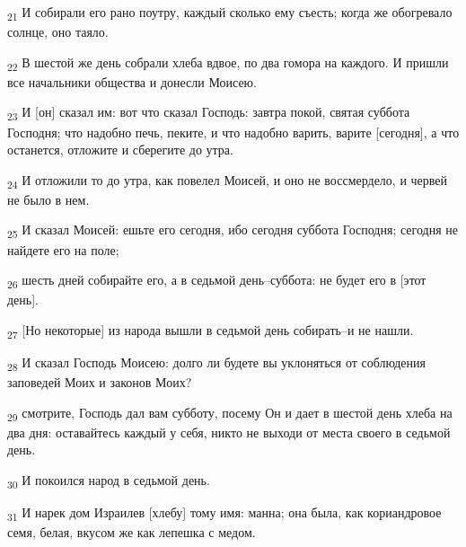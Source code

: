 \begin{tcolorbox}
\textsubscript{21} И собирали его рано поутру, каждый сколько ему съесть; когда же обогревало солнце, оно таяло.
\end{tcolorbox}
\begin{tcolorbox}
\textsubscript{22} В шестой же день собрали хлеба вдвое, по два гомора на каждого. И пришли все начальники общества и донесли Моисею.
\end{tcolorbox}
\begin{tcolorbox}
\textsubscript{23} И [он] сказал им: вот что сказал Господь: завтра покой, святая суббота Господня; что надобно печь, пеките, и что надобно варить, варите [сегодня], а что останется, отложите и сберегите до утра.
\end{tcolorbox}
\begin{tcolorbox}
\textsubscript{24} И отложили то до утра, как повелел Моисей, и оно не воссмердело, и червей не было в нем.
\end{tcolorbox}
\begin{tcolorbox}
\textsubscript{25} И сказал Моисей: ешьте его сегодня, ибо сегодня суббота Господня; сегодня не найдете его на поле;
\end{tcolorbox}
\begin{tcolorbox}
\textsubscript{26} шесть дней собирайте его, а в седьмой день--суббота: не будет его в [этот день].
\end{tcolorbox}
\begin{tcolorbox}
\textsubscript{27} [Но некоторые] из народа вышли в седьмой день собирать--и не нашли.
\end{tcolorbox}
\begin{tcolorbox}
\textsubscript{28} И сказал Господь Моисею: долго ли будете вы уклоняться от соблюдения заповедей Моих и законов Моих?
\end{tcolorbox}
\begin{tcolorbox}
\textsubscript{29} смотрите, Господь дал вам субботу, посему Он и дает в шестой день хлеба на два дня: оставайтесь каждый у себя, никто не выходи от места своего в седьмой день.
\end{tcolorbox}
\begin{tcolorbox}
\textsubscript{30} И покоился народ в седьмой день.
\end{tcolorbox}
\begin{tcolorbox}
\textsubscript{31} И нарек дом Израилев [хлебу] тому имя: манна; она была, как кориандровое семя, белая, вкусом же как лепешка с медом.
\end{tcolorbox}
